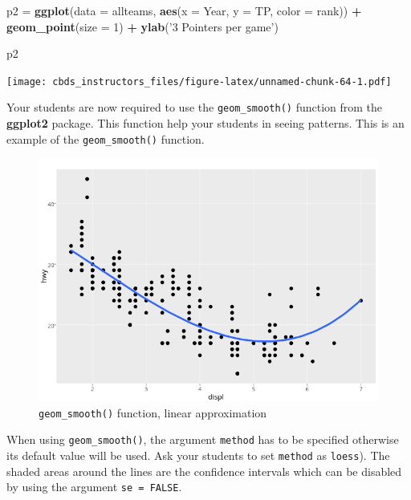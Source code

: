 \documentclass[]{book}
\newenvironment{Shaded}{\begin{snugshade}}{\end{snugshade}}
\newcommand{\DataTypeTok}[1]{\textcolor[rgb]{0.13,0.29,0.53}{#1}}
\newcommand{\DecValTok}[1]{\textcolor[rgb]{0.00,0.00,0.81}{#1}}
\newcommand{\KeywordTok}[1]{\textcolor[rgb]{0.13,0.29,0.53}{\textbf{#1}}}
\newcommand{\NormalTok}[1]{#1}
\newcommand{\OperatorTok}[1]{\textcolor[rgb]{0.81,0.36,0.00}{\textbf{#1}}}
\newcommand{\StringTok}[1]{\textcolor[rgb]{0.31,0.60,0.02}{#1}}
\begin{document}
\begin{Shaded}
\begin{Highlighting}[]
\NormalTok{p2 =}\StringTok{ }\KeywordTok{ggplot}\NormalTok{(}\DataTypeTok{data =}\NormalTok{ allteams, }\KeywordTok{aes}\NormalTok{(}\DataTypeTok{x =}\NormalTok{ Year, }\DataTypeTok{y =}\NormalTok{ TP, }\DataTypeTok{color =}\NormalTok{ rank)) }\OperatorTok{+}
\StringTok{    }\KeywordTok{geom_point}\NormalTok{(}\DataTypeTok{size =} \DecValTok{1}\NormalTok{) }\OperatorTok{+}
\StringTok{    }\KeywordTok{ylab}\NormalTok{(}\StringTok{'3 Pointers per game'}\NormalTok{)}

\NormalTok{p2}
\end{Highlighting}
\end{Shaded}

\texttt{[image: cbds\_instructors\_files/figure-latex/unnamed-chunk-64-1.pdf]}

Your students are now required to use the \texttt{geom\_smooth()} function from the \textbf{ggplot2} package. This function help your students in seeing patterns. This is an example of the \texttt{geom\_smooth()} function.

\begin{figure}
\centering
\includegraphics{./files/07_visualization_geom_smooth.png}
\caption{\texttt{geom\_smooth()} function, linear approximation}
\end{figure}

When using \texttt{geom\_smooth()}, the argument \texttt{method} has to be specified otherwise its default value will be used. Ask your students to set \texttt{method} as \texttt{\textquotesingle{}loess\textquotesingle{}}). The shaded areas around the lines are the confidence intervals which can be disabled by using the argument \texttt{se\ =\ FALSE}.
\end{document}
